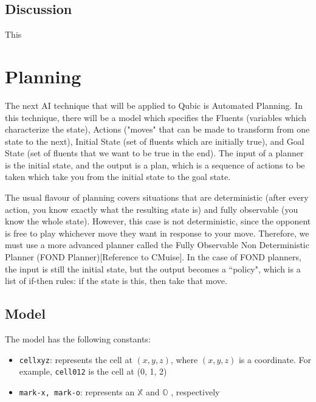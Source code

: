\documentclass[11pt]{article}
\newcommand{\XX}{$\mathbb{X}$ }
\newcommand{\OO}{$\mathbb{O}$ }
\begin{document}

\subsection{Discussion}
This

\section{Planning}
The next AI technique that will be applied to Qubic is Automated Planning. In this technique, there will be a model which specifies the Fluents (variables which characterize the state), Actions ("moves" that can be made to transform from one state to the next), Initial State (set of fluents which are initially true), and Goal State (set of fluents that we want to be true in the end). The input of a planner is the initial state, and the output is a plan, which is a sequence of actions to be taken which take you from the initial state to the goal state.

The usual flavour of planning covers situations that are deterministic (after every action, you know exactly what the resulting state is) and fully observable (you know the whole state). However, this case is not deterministic, since the opponent is free to play whichever move they want in response to your move. Therefore, we must use a more advanced planner called the Fully Observable Non Deterministic Planner (FOND Planner)[Reference to CMuise]. In the case of FOND planners, the input is still the initial state, but the output becomes a ``policy", which is a list of if-then rules: if the state is this, then take that move.


\subsection{Model}
The model has the following constants:
\begin{itemize}
    \item \texttt{cellxyz}: represents the cell at $(x, y, z)$, where $(x, y, z)$ is a coordinate. For example, \texttt{cell012} is the cell at (0, 1, 2)
    \item \texttt{mark-x, mark-o}: represents an \XX and \OO, respectively
\end{itemize}
\end{document}
